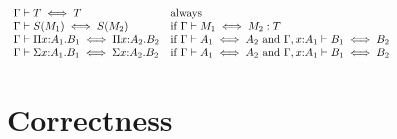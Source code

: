 \documentclass{article}
\theoremstyle{break}
\begin{document}
\[\begin{array}{lp{4.2truein}}
\akindequiv{\context}{\ktype}{\ktype}&always\\
\akindequiv{\context}{\ksingleton{\constructor_1}}
   {\ksingleton{\constructor_2}}&
  if $\aconequiv{\context}{\constructor_1}{\constructor_2}{\ktype}$\\
\akindequiv{\context}{\kpi{\cvar}{\kind_1}{\otherkind_1}} 
   {\kpi{\cvar}{\kind_2}{\otherkind_2}}&
  if $\akindequiv{\context}{\kind_1}{\kind_2}$ and
  $\akindequiv{\context,\cvar{:}\kind_1}{\otherkind_1}{\otherkind_2}$\\
\akindequiv{\context}{\ksigma{\cvar}{\kind_1}{\otherkind_1}} 
   {\ksigma{\cvar}{\kind_2}{\otherkind_2}}&
  if $\akindequiv{\context}{\kind_1}{\kind_2}$ and
  $\akindequiv{\context,\cvar{:}\kind_1}{\otherkind_1}{\otherkind_2}$\\
\end{array}
\]

\section{Correctness}

\newcommand{\semanticvalidtype}[2]{{#2}\mathrm{\ type\ }[#1]}
\newcommand{\semanticequivtype}[3]{{#2}\mathrm{\ is\ }{#3}\ [#1]}
\newcommand{\semanticsubtype}[3]{{#2}\mathrm{\ sub\ }{#3}\ [#1]}
\newcommand{\semanticvalidterm}[3]{{#2}\mathrm{\ in\ }{#3}\ [#1]}
\newcommand{\semanticequivterm}[4]{{#2}\mathrm{\ is\ }{#3}\mathrm{\ in\ }{#4}\ [#1]}
\newcommand{\world}{\Delta}
\newcommand{\semanticcontext}[1]{{#1}\,\mbox{ctxt}}
\newcommand{\normterm}[3]{{#1}\vdash{#2}\mbox{\ norm\ }{#3}}
\newcommand{\normtype}[2]{{#1}\vdash{#2}\mbox{\ norm}}
\newcommand{\bisim}[4]{{#1}\vdash{#2}\mbox{\ bisim\ }{#3} : #4}
\newcommand{\normE}[3]{{#1}\vdash{#2}\mbox{\ norm}^*\ {#3}}
\newcommand{\algorithmicequivterm}[4]{#1\vdash #2 \iff #3 : #4}
\newcommand{\algorithmicequivtype}[3]{#1\vdash #2 \iff #3}
\newcommand{\algorithmicwhnf}{\headnormsto}
\newcommand{\semanticE}[3]{#2\mbox{\ compute\ }#3\ [#1]}
\end{document}
